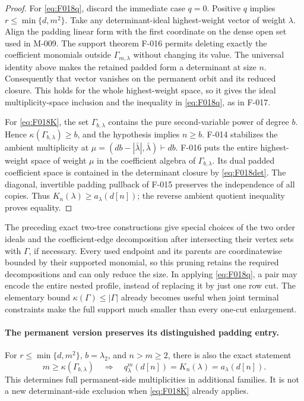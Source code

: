 \begin{proof}
For \eqref{eq:F018q}, discard the immediate case \(q=0\).
Positive \(q\) implies \(r\leq\min\{d,m^2\}\).
Take any determinant-ideal highest-weight vector of weight
\(\lambda\). Align the padding linear form with the first
coordinate on the dense open set used in M-009. The support
theorem F-016 permits deleting exactly the coefficient monomials
outside \(\Gamma_{m,\lambda}\) without changing its value.
The universal identity above makes the retained padded form
a determinant at size \(n\). Consequently that vector
vanishes on the permanent orbit and its reduced closure.
This holds for the whole highest-weight space, so it gives
the ideal multiplicity-space inclusion and the inequality
in \eqref{eq:F018q}, as in F-017.

For \eqref{eq:F018K}, the set \(\Gamma_{b,\lambda}\)
contains the pure second-variable power of degree \(b\).
Hence \(\kappa(\Gamma_{b,\lambda})\geq b\), and
the hypothesis implies \(n\geq b\).
F-014 stabilizes the ambient multiplicity at
\(\mu=(db-|\bar\lambda|,\bar\lambda)\vdash db\).
F-016 puts the entire highest-weight space of weight \(\mu\)
in the coefficient algebra of \(\Gamma_{b,\lambda}\).
Its dual padded coefficient space is contained in the
determinant closure by \eqref{eq:F018det}. The diagonal,
invertible padding pullback of F-015 preserves the independence
of all copies. Thus \(K_n(\lambda)\geq a_\lambda(d[n])\);
the reverse ambient quotient inequality proves equality.
\end{proof}

The preceding exact two-tree constructions give special choices of
the two order ideals and the coefficient-edge decomposition
after intersecting their vertex sets with \(\Gamma\), if
necessary. Every used endpoint and its parents are coordinatewise
bounded by their supported monomial, so this pruning retains
the required decompositions and can only reduce the size.
In applying \eqref{eq:F018q}, a pair may encode the entire
nested profile, instead of replacing it by just one row cut.
The elementary bound \(\kappa(\Gamma)\leq|\Gamma|\)
already becomes useful when joint terminal constraints make
the full support much smaller than every one-cut enlargement.

\paragraph{The permanent version preserves its distinguished padding entry.}
For \(r\leq\min\{d,m^2\}\), \(b=\lambda_2\), and
\(n>m\geq2\), there is also the exact statement
\begin{equation}\label{eq:F018per}
 m\geq\kappa(\Gamma_{b,\lambda})
       \quad\Longrightarrow\quad
          q^m_\lambda(d[n])=K_n(\lambda)=a_\lambda(d[n]).
\end{equation}
This determines full permanent-side multiplicities in additional
families. It is not a new determinant-side exclusion when
\eqref{eq:F018K} already applies.

